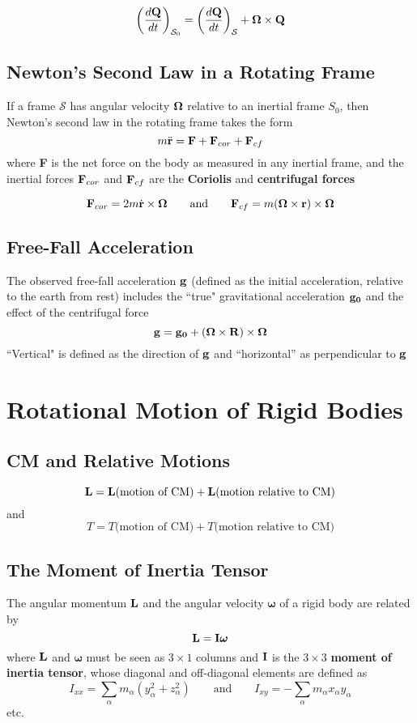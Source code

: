 \documentclass{article}
\begin{document}
$$
\left( \frac{d\vb{Q}}{dt} \right)_{\mathcal{S}_0} = \left( \frac{d\vb{Q}}{dt} \right)_{\mathcal{S}} + \vb{\Omega} \times \vb{Q}
$$

\subsection{Newton's Second Law in a Rotating Frame}
If a frame $\mathcal{S}$ has angular velocity $\vb{\Omega}$ relative to an inertial frame $S_{0}$, then Newton's second law in the rotating frame takes the form
$$
m\ddot{\vb{r}} = \vb{F} + \vb{F}_{cor} + \vb{F}_{cf}
$$
where \textbf{F} is the net force on the body as measured in any inertial frame, and the inertial forces $\vb{F}_{cor}$ and $\vb{F}_{cf}$ are the \textbf{Coriolis} and \textbf{centrifugal forces}

$$
\vb{F}_{cor} = 2m\dot{\vb{r}} \times \vb{\Omega} \qquad \text{and} \qquad \vb{F}_{cf} = m(\vb{\Omega} \times \vb{r}) \times \vb{\Omega}
$$

\subsection{Free-Fall Acceleration}
The observed free-fall acceleration $\vb{g}$ (defined as the initial acceleration, relative to the earth from rest) includes the ``true" gravitational acceleration $\vb{g_0}$ and the effect of the centrifugal force
$$
\vb{g} = \vb{g_0} + (\vb{\Omega} \times \vb{R}) \times \vb{\Omega}
$$
``Vertical" is defined as the direction of $\vb{g}$ and ``horizontal'' as perpendicular to $\vb{g}$
\section{Rotational Motion of Rigid Bodies}
\subsection{CM and Relative Motions}
$$
\vb{L} = \vb{L}\text{(motion of CM)} + \vb{L}\text{(motion relative to CM)}
$$
and 
$$
T = T\text{(motion of CM)} + T\text{(motion relative to CM)}
$$
\subsection{The Moment of Inertia Tensor}
The angular momentum $\vb{L}$ and the angular velocity $\bm\omega$ of a rigid body are related by 
$$
\vb{L} = \vb{I}\bm\omega
$$
where $\vb{L}$ and $\bm\omega$ must be seen as $3 \times 1$ columns and $\vb{I}$ is the $3\times3$ \textbf{moment of inertia tensor}, whose diagonal and off-diagonal elements are defined as 
$$
I_{xx} = \sum_{\alpha} m_{\alpha}(y_{\alpha}^2 + z_{\alpha}^2) \qquad \text{and} \qquad I_{xy} = -\sum_{\alpha} m_{\alpha}x_{\alpha}y_{\alpha}
$$
etc.
\end{document}
